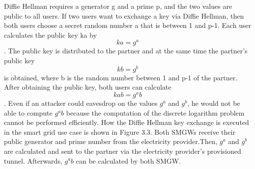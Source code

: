 Diffie Hellman requires a generator g and a prime p, and the two values are public to all users. If two users want to exchange a key via Diffie Hellman, then both users choose a secret random number a that is between 1 and p-1. Each user calculates the public key ka by \[ ka=g^a \]. The public key is distributed to the partner and at the same time the partner's public key \[ kb=g^b \] is obtained, where b is the random number between 1 and p-1 of the partner. After obtaining the public key, both users can calculate\[ kab=g^ab \]. Even if an attacker could eavesdrop on the values $g^a$ and $g^b$, he would not be able to compute $g^ab$ because the computation of the discrete logarithm problem cannot be performed efficiently. How the Diffie Hellman key exchange is executed in the smart grid use case is shown in Figure 3.3. 
Both SMGWs receive their public generator and prime number from the electricity provider.Then, $g^a$ and $g^b$ are calculated and sent to the partner via the electricity provider's provisioned tunnel. Afterwards, $g^ab$ can be calculated by both SMGW.


